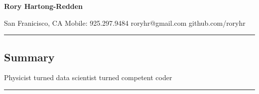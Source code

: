 \documentclass[10pt,letterpaper]{article}
\begin{document}
{\raggedright 
\LARGE{\bf Rory Hartong-Redden}\\}

{\raggedleft 
San Franicisco, CA \textbar\/ Mobile: 925.297.9484 \textbar\/ roryhr@gmail.com \textbar\/   github.com/roryhr\\}
\hrule


\vspace{-0.4em}
\subsection*{Summary}

\begin{centering}  
Physicist turned data scientist turned competent coder\\
\end{centering}

\vspace{0.4em}

\hrule
\vspace{-0.4em}
\end{document}
